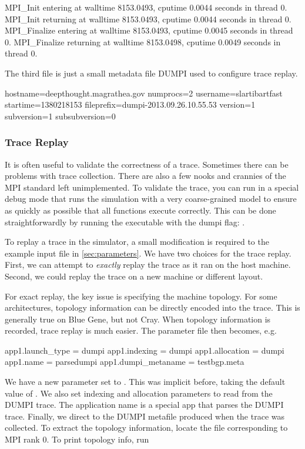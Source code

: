 \begin{ViFile}
MPI_Init entering at walltime 8153.0493, cputime 0.0044 seconds in thread 0.
MPI_Init returning at walltime 8153.0493, cputime 0.0044 seconds in thread 0.
MPI_Finalize entering at walltime 8153.0493, cputime 0.0045 seconds in thread 0.
MPI_Finalize returning at walltime 8153.0498, cputime 0.0049 seconds in thread 0.
\end{ViFile}

The third file is just a small metadata file DUMPI used to configure trace replay.
\begin{ViFile}
hostname=deepthought.magrathea.gov
numprocs=2
username=slartibartfast
startime=1380218153
fileprefix=dumpi-2013.09.26.10.55.53
version=1
subversion=1
subsubversion=0
\end{ViFile}

\subsubsection{Trace Replay}
\label{subsec:dumpi:tracereplay}
It is often useful to validate the correctness of a trace.  Sometimes there can be problems with trace collection. 
There are also a few nooks and crannies of the MPI standard left unimplemented.
To validate the trace, you can run in a special debug mode that runs the simulation with a very coarse-grained model
to ensure as quickly as possible that all functions execute correctly.
This can be done straightforwardly by running the executable with the dumpi flag: .

To replay a trace in the simulator, a small modification is required to the example input file in \ref{sec:parameters}.
We have two choices for the trace replay.  First, we can attempt to \emph{exactly} replay the trace as it ran on the host machine.
Second, we could replay the trace on a new machine or different layout.

For exact replay, the key issue is specifying the machine topology.
For some architectures, topology information can be directly encoded into the trace.
This is generally true on Blue Gene, but not Cray.
When topology information is recorded, trace replay is much easier.
The parameter file then becomes, e.g.

\begin{ViFile}
app1.launch_type = dumpi
app1.indexing = dumpi
app1.allocation = dumpi
app1.name = parsedumpi
app1.dumpi_metaname = testbgp.meta
\end{ViFile}
We have a new parameter  set to .
This was implicit before, taking the default value of .
We also set indexing and allocation parameters to read from the DUMPI trace.
The application name is a special app that parses the DUMPI trace.
Finally, we direct \sstmacro to the DUMPI metafile produced when the trace was collected.
To extract the topology information, locate the  file corresponding to MPI rank 0.
To print topology info, run

